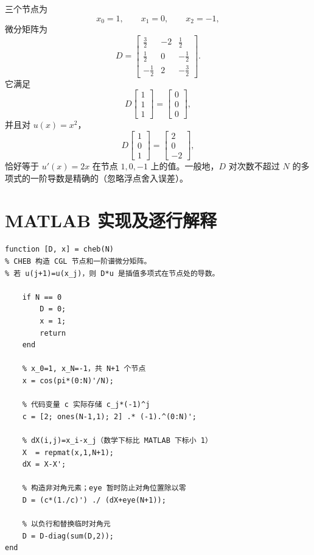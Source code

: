 \documentclass[11pt,a4paper]{ctexart}
\numberwithin{equation}{section}
\begin{document}
三个节点为
\begin{equation}
  x_0=1,\qquad x_1=0,\qquad x_2=-1,
\end{equation}
微分矩阵为
\begin{equation}
  D=\begin{bmatrix}
  \frac32&-2&\frac12\\[3pt]
  \frac12&0&-\frac12\\[3pt]
  -\frac12&2&-\frac32
  \end{bmatrix}.
\end{equation}
它满足
\begin{equation}
  D\begin{bmatrix}1\\1\\1\end{bmatrix}
  =\begin{bmatrix}0\\0\\0\end{bmatrix},
\end{equation}
并且对 $u(x)=x^2$，
\begin{equation}
  D\begin{bmatrix}1\\0\\1\end{bmatrix}
  =\begin{bmatrix}2\\0\\-2\end{bmatrix},
\end{equation}
恰好等于 $u'(x)=2x$ 在节点 $1,0,-1$ 上的值。一般地，$D$ 对次数不超过 $N$ 的多项式的一阶导数是精确的（忽略浮点舍入误差）。

\section{MATLAB 实现及逐行解释}

\begin{lstlisting}[caption={Chebyshev 一阶微分矩阵}]
function [D, x] = cheb(N)
% CHEB 构造 CGL 节点和一阶谱微分矩阵。
% 若 u(j+1)=u(x_j)，则 D*u 是插值多项式在节点处的导数。

    if N == 0
        D = 0;
        x = 1;
        return
    end

    % x_0=1, x_N=-1，共 N+1 个节点
    x = cos(pi*(0:N)'/N);

    % 代码变量 c 实际存储 c_j*(-1)^j
    c = [2; ones(N-1,1); 2] .* (-1).^(0:N)';

    % dX(i,j)=x_i-x_j（数学下标比 MATLAB 下标小 1）
    X  = repmat(x,1,N+1);
    dX = X-X';

    % 构造非对角元素；eye 暂时防止对角位置除以零
    D = (c*(1./c)') ./ (dX+eye(N+1));

    % 以负行和替换临时对角元
    D = D-diag(sum(D,2));
end
\end{lstlisting}
\end{document}
